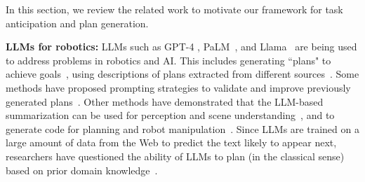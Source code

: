 In this section, we review the related work to motivate our framework for task anticipation and plan generation.

\vspace{-0.75em}
\textbf{LLMs for robotics:} LLMs such as GPT-4 \cite{OpenAI2023GPT4TR}, PaLM~\cite{chowdhery2022palm}, and Llama~\cite{touvron2023llama} are being used to address problems in robotics and AI. This includes generating ``plans" to achieve goals~\cite{huang2022inner,ding2023task,Sharma2021SkillIA}, using descriptions of plans extracted from different sources~\cite{Ahn2022DoAI,huang2022language, Lin2023SwiftSageAG,lin2023text2motion}. Some methods have proposed prompting strategies to validate and improve previously generated plans~\cite{raman2022planning, silver2023generalized}. Other methods have demonstrated that the LLM-based summarization can be used for perception and scene understanding~\cite{wu2023tidybot}, and to generate code for planning and robot manipulation~\cite{silver2023generalized,10161317,huang2023voxposer}. Since LLMs are trained on a large amount of data from the Web to predict the text likely to appear next, researchers have questioned the ability of LLMs to plan (in the classical sense) based on prior domain knowledge~\cite{collins2022structured,valmeekam2023large}. 


